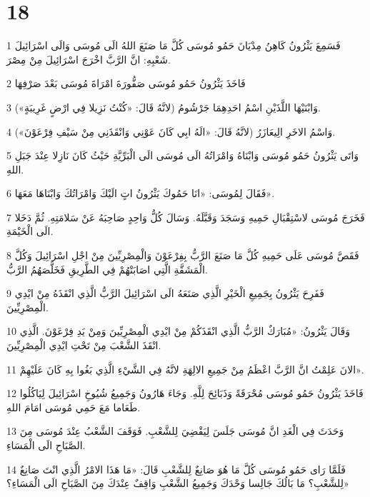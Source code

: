 \chapter{18}

\par 1 فَسَمِعَ يَثْرُونُ كَاهِنُ مِدْيَانَ حَمُو مُوسَى كُلَّ مَا صَنَعَ اللهُ الَى مُوسَى وَالَى اسْرَائِيلَ شَعْبِهِ: انَّ الرَّبَّ اخْرَجَ اسْرَائِيلَ مِنْ مِصْرَ.
\par 2 فَاخَذَ يَثْرُونُ حَمُو مُوسَى صَفُّورَةَ امْرَاةَ مُوسَى بَعْدَ صَرْفِهَا
\par 3 وَابْنَيْهَا اللَّذَيْنِ اسْمُ احَدِهِمَا جَرْشُومُ (لانَّهُ قَالَ: «كُنْتُ نَزِيلا فِي ارْضٍ غَرِيبَةٍ»).
\par 4 وَاسْمُ الاخَرِ الِيعَازَرُ (لانَّهُ قَالَ: «الَهُ ابِي كَانَ عَوْنِي وَانْقَذَنِي مِنْ سَيْفِ فِرْعَوْنَ»).
\par 5 وَاتَى يَثْرُونُ حَمُو مُوسَى وَابْنَاهُ وَامْرَاتُهُ الَى مُوسَى الَى الْبَرِّيَّةِ حَيْثُ كَانَ نَازِلا عِنْدَ جَبَلِ اللهِ.
\par 6 فَقَالَ لِمُوسَى: «انَا حَمُوكَ يَثْرُونُ اتٍ الَيْكَ وَامْرَاتُكَ وَابْنَاهَا مَعَهَا».
\par 7 فَخَرَجَ مُوسَى لاسْتِقْبَالِ حَمِيهِ وَسَجَدَ وَقَبَّلَهُ. وَسَالَ كُلُّ وَاحِدٍ صَاحِبَهُ عَنْ سَلامَتِهِ. ثُمَّ دَخَلا الَى الْخَيْمَةِ.
\par 8 فَقَصَّ مُوسَى عَلَى حَمِيهِ كُلَّ مَا صَنَعَ الرَّبُّ بِفِرْعَوْنَ وَالْمِصْرِيِّينَ مِنْ اجْلِ اسْرَائِيلَ وَكُلَّ الْمَشَقَّةِ الَّتِي اصَابَتْهُمْ فِي الطَّرِيقِ فَخَلَّصَهُمُ الرَّبُّ.
\par 9 فَفَرِحَ يَثْرُونُ بِجَمِيعِ الْخَيْرِ الَّذِي صَنَعَهُ الَى اسْرَائِيلَ الرَّبُّ الَّذِي انْقَذَهُ مِنْ ايْدِي الْمِصْرِيِّينَ.
\par 10 وَقَالَ يَثْرُونُ: «مُبَارَكٌ الرَّبُّ الَّذِي انْقَذَكُمْ مِنْ ايْدِي الْمِصْرِيِّينَ وَمِنْ يَدِ فِرْعَوْنَ. الَّذِي انْقَذَ الشَّعْبَ مِنْ تَحْتِ ايْدِي الْمِصْرِيِّينَ.
\par 11 الانَ عَلِمْتُ انَّ الرَّبَّ اعْظَمُ مِنْ جَمِيعِ الالِهَةِ لانَّهُ فِي الشَّيْءِ الَّذِي بَغُوا بِهِ كَانَ عَلَيْهِمْ».
\par 12 فَاخَذَ يَثْرُونُ حَمُو مُوسَى مُحْرَقَةً وَذَبَائِحَ لِلَّهِ. وَجَاءَ هَارُونُ وَجَمِيعُ شُيُوخِ اسْرَائِيلَ لِيَاكُلُوا طَعَاما مَعَ حَمِي مُوسَى امَامَ اللهِ.
\par 13 وَحَدَثَ فِي الْغَدِ انَّ مُوسَى جَلَسَ لِيَقْضِيَ لِلشَّعْبِ. فَوَقَفَ الشَّعْبُ عِنْدَ مُوسَى مِنَ الصَّبَاحِ الَى الْمَسَاءِ.
\par 14 فَلَمَّا رَاى حَمُو مُوسَى كُلَّ مَا هُوَ صَانِعٌ لِلشَّعْبِ قَالَ: «مَا هَذَا الامْرُ الَّذِي انْتَ صَانِعٌ لِلشَّعْبِ؟ مَا بَالُكَ جَالِسا وَحْدَكَ وَجَمِيعُ الشَّعْبِ وَاقِفٌ عِنْدَكَ مِنَ الصَّبَاحِ الَى الْمَسَاءِ؟»
